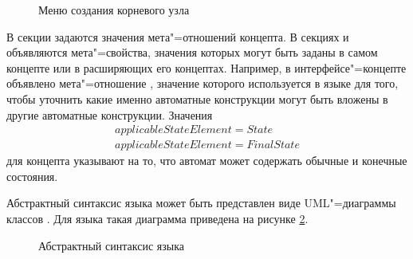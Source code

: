 \begin{itemize}
\begin{figure}
 \centering
 \caption{Меню создания корневого узла}
 \label{fig:CreateStateMachine}
\end{figure}

В секции  задаются значения мета"=отношений концепта. В секциях  и
 объявляются мета"=свойства, значения которых могут быть заданы в самом концепте или в
расширяющих его концептах. Например, в интерфейсе"=концепте  объявлено мета"=отношение 
, значение которого используется в языке  для того, чтобы уточнить
какие именно автоматные конструкции могут быть вложены в другие автоматные конструкции. Значения
$$
\begin{array}{l}
applicableStateElement = State\\
applicableStateElement = FinalState
\end{array}
$$
для концепта  указывают на то, что автомат может содержать обычные и конечные состояния.
\end{itemize}

Абстрактный синтаксис языка может быть представлен виде UML"=диаграммы классов \cite{uml}. Для языка 
такая диаграмма приведена на рисунке \ref{fig:AbstractSyntax}.

\begin{figure}
 \centering
 \caption{Абстрактный синтаксис языка }
 \label{fig:AbstractSyntax}
\end{figure}
